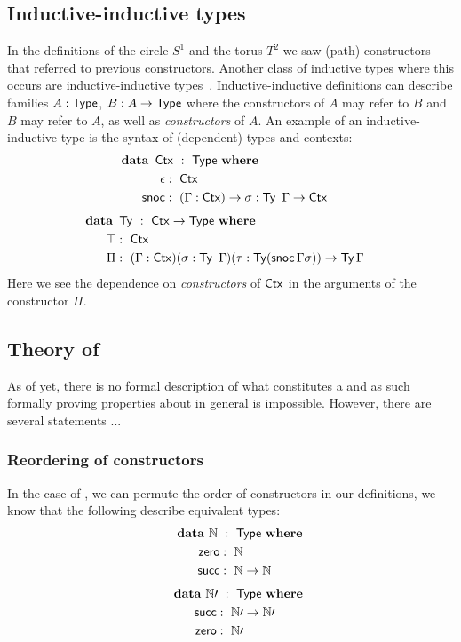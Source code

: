 \documentclass[a4paper,10pt]{article}
\begin{document}
\subsection{Inductive-inductive types}
\label{sec:inductiveinductive}

In the definitions of the circle $S^1$ and the torus $T^2$ we saw
(path) constructors that referred to previous constructors. Another
class of inductive types where this occurs are inductive-inductive
types~\cite{Altenkirch2011}. Inductive-inductive definitions can
describe families $A : \mathsf{Type}$, $B : A \to \mathsf{Type}$ where the
constructors of $A$ may refer to $B$ and $B$ may refer to $A$, as well
as \emph{constructors} of $A$. An example of an inductive-inductive
type is the syntax of (dependent) types and contexts:
%
\begin{alignat*}{2}
  &\rlap{$\data\ \Ctx\ :\ \Type\ \where$} \\
  &&\ \ \epsilon &:\ \Ctx \\
  &&\ \ \snoc    &:\ (\Gamma : \Ctx) \to \sigma : \Ty\ \Gamma \to \Ctx
\end{alignat*}
%
\begin{alignat*}{2}
  &\rlap{$\data\ \Ty\ :\ \Ctx \to \Type\ \where$} \\
  &&\ \ \unitty &:\ \Ctx \\
  &&\ \ \Pi     &:\ (\Gamma : \Ctx) (\sigma : \Ty\ \Gamma) (\tau : \Ty (\snoc \Gamma \sigma)) \to \Ty \Gamma
\end{alignat*}
%
Here we see the dependence on \emph{constructors} of $\operatorname{\mathsf{Ctx}}$ in the
arguments of the constructor $\Pi$.

\subsection{Theory of \hits}
\label{sec:theoryhits}

As of yet, there is no formal description of what constitutes a \hit
and as such formally proving properties about \hits in general is
impossible. However, there are several statements ...

\subsubsection{Reordering of constructors}

In the case of \oits, we can permute the order of constructors in our
definitions, \ie we know that the following describe equivalent types:
%
\begin{alignat*}{2}
  &\rlap{$\data\ \Nat\ :\ \Type\ \where$} \\
  &&\ \ \zero &:\ \Nat \\
  &&\ \ \suc  &:\ \Nat \to \Nat
\end{alignat*}
%
\begin{alignat*}{2}
  &\rlap{$\data\ \Nat \prime\ :\ \Type\ \where$} \\
  &&\ \ \suc  &:\ \Nat \prime \to \Nat \prime \\
  &&\ \ \zero &:\ \Nat \prime
\end{alignat*}
\end{document}
